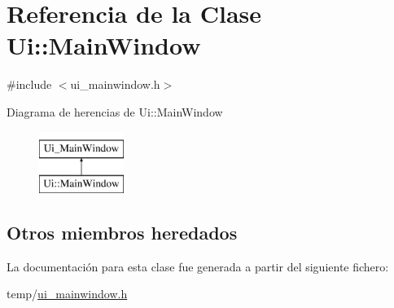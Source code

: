 \hypertarget{class_ui_1_1_main_window}{}\section{Referencia de la Clase Ui\+:\+:Main\+Window}
\label{class_ui_1_1_main_window}


{\ttfamily \#include $<$ui\+\_\+mainwindow.\+h$>$}

Diagrama de herencias de Ui\+:\+:Main\+Window\begin{figure}[H]
\begin{center}
\leavevmode
\includegraphics[height=2.000000cm]{class_ui_1_1_main_window}
\end{center}
\end{figure}
\subsection*{Otros miembros heredados}


La documentación para esta clase fue generada a partir del siguiente fichero\+:\begin{DoxyCompactItemize}
\item 
temp/\hyperlink{ui__mainwindow_8h}{ui\+\_\+mainwindow.\+h}\end{DoxyCompactItemize}
